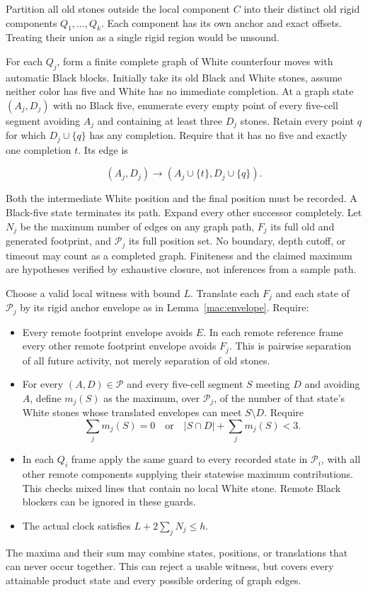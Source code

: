 \documentclass[11pt]{article}
\theoremstyle{definition}
\theoremstyle{remark}
\begin{document}
Partition all old stones outside the local component \(C\) into their distinct old rigid components \(Q_1,\ldots,Q_k\). Each component has its own anchor and exact offsets. Treating their union as a single rigid region would be unsound.

For each \(Q_j\), form a finite complete graph of White counterfour moves with automatic Black blocks. Initially take its old Black and White stones, assume neither color has five and White has no immediate completion. At a graph state \((A_j,D_j)\) with no Black five, enumerate every empty point of every five-cell segment avoiding \(A_j\) and containing at least three \(D_j\) stones. Retain every point \(q\) for which \(D_j\cup\{q\}\) has any completion. Require that it has no five and exactly one completion \(t\). Its edge is

\[
(A_j,D_j)\longrightarrow(A_j\cup\{t\},D_j\cup\{q\}).
\]

Both the intermediate White position and the final position must be recorded. A Black-five state terminates its path. Expand every other successor completely. Let \(N_j\) be the maximum number of edges on any graph path, \(F_j\) its full old and generated footprint, and \(\mathcal P_j\) its full position set. No boundary, depth cutoff, or timeout may count as a completed graph. Finiteness and the claimed maximum are hypotheses verified by exhaustive closure, not inferences from a sample path.

Choose a valid local witness with bound \(L\). Translate each \(F_j\) and each state of \(\mathcal P_j\) by its rigid anchor envelope as in Lemma~\ref{mac:envelope}. Require:

\begin{itemize}
\item Every remote footprint envelope avoids \(E\). In each remote reference frame every other remote footprint envelope avoids \(F_j\). This is pairwise separation of all future activity, not merely separation of old stones.
\item For every \((A,D)\in\mathcal P\) and every five-cell segment \(S\) meeting \(D\) and avoiding \(A\), define \(m_j(S)\) as the maximum, over \(\mathcal P_j\), of the number of that state's White stones whose translated envelopes can meet \(S\setminus D\). Require
  \[
  \sum_jm_j(S)=0\quad\text{or}\quad |S\cap D|+\sum_jm_j(S)<3.\tag{MI}
  \]
\item In each \(Q_i\) frame apply the same guard to every recorded state in \(\mathcal P_i\), with all other remote components supplying their statewise maximum contributions. This checks mixed lines that contain no local White stone. Remote Black blockers can be ignored in these guards.
\item The actual clock satisfies \(L+2\sum_jN_j\le h\).

\end{itemize}
The maxima and their sum may combine states, positions, or translations that can never occur together. This can reject a usable witness, but covers every attainable product state and every possible ordering of graph edges.
\end{document}

